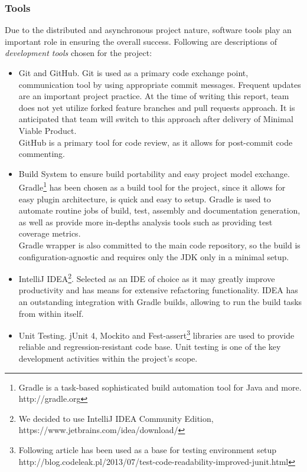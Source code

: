 \subsubsection{Tools}

Due to the distributed and asynchronous project nature, software tools play an important role in ensuring the overall success. Following are descriptions of \emph{development tools} chosen for the project:

\vspace{1mm}

\begin{itemize}
	\item Git and GitHub. Git is used as a primary code exchange point, communication tool by using appropriate commit messages. Frequent updates are an important project practice. At the time of writing this report, team does not yet utilize forked feature branches and pull requests approach. It is anticipated that team will switch to this approach after delivery of Minimal Viable Product. \\GitHub is a primary tool for code review, as it allows for post-commit code commenting.
	\item Build System to ensure build portability and easy project model exchange.
	 Gradle\footnote{Gradle is a task-based sophisticated build automation tool for Java and more. http://gradle.org} has been chosen as a build tool for the project, since it allows for easy plugin architecture, is quick and easy to setup. %
	 Gradle is used to automate routine jobs of build, test, assembly  and documentation generation,
	as well as provide more in-depths analysis tools such as providing test coverage metrics.\\Gradle wrapper is also committed to the main code repository, so the build is configuration-agnostic and requires only the JDK only in a minimal setup.
	\item IntelliJ IDEA\footnote{We decided to use IntelliJ IDEA Community Edition, https://www.jetbrains.com/idea/download/}. Selected as an IDE of choice as it may greatly improve productivity and has means for extensive refactoring functionality. IDEA has an outstanding
	integration with Gradle builds, allowing to run the build tasks from within itself.
	\item Unit Testing. jUnit 4, Mockito and Fest-assert\footnote{Following article has been used as a base for testing environment setup http://blog.codeleak.pl/2013/07/test-code-readability-improved-junit.html} libraries are used to provide reliable and regression-resistant code base. Unit testing is one of the key development activities within the project's scope.
\end{itemize}

